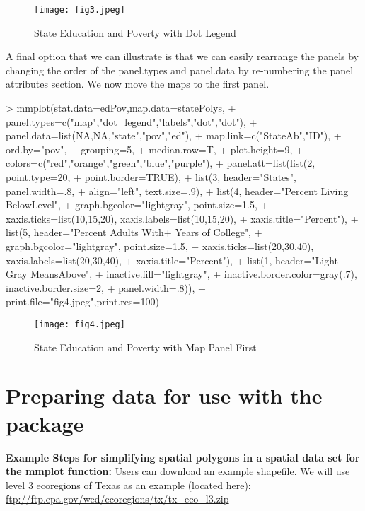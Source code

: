 \documentclass{article}
\begin{document}
\begin{figure}[!tbp] 
\begin{center} 
\texttt{[image: fig3.jpeg]}
  \caption{State Education and Poverty with Dot Legend}
  \label{fig3} 
\end{center} 
\end{figure}
A final option that we can illustrate is that we can easily rearrange the panels by changing the order of the panel.types and panel.data by re-numbering the panel attributes section.  We now move the maps to the first panel.
\begin{Schunk}
\begin{Sinput}
> mmplot(stat.data=edPov,map.data=statePolys,
+ panel.types=c("map","dot_legend","labels","dot","dot"),
+ panel.data=list(NA,NA,"state","pov","ed"),
+ map.link=c("StateAb","ID"),
+ ord.by="pov", 
+ grouping=5, 
+ median.row=T,
+ plot.height=9, 
+ colors=c("red","orange","green","blue","purple"),
+ panel.att=list(list(2, point.type=20,
+ point.border=TRUE),
+ list(3, header="States", panel.width=.8, 
+ align="left", text.size=.9),
+ list(4, header="Percent Living Below\nPoverty Level",
+ graph.bgcolor="lightgray", point.size=1.5,
+ xaxis.ticks=list(10,15,20), xaxis.labels=list(10,15,20),
+ xaxis.title="Percent"),
+ list(5, header="Percent Adults With+ Years of College",
+ graph.bgcolor="lightgray", point.size=1.5,
+ xaxis.ticks=list(20,30,40), xaxis.labels=list(20,30,40), 
+ xaxis.title="Percent"),
+ list(1, header="Light Gray Means\nHighlighted Above",
+ inactive.fill="lightgray",     
+ inactive.border.color=gray(.7), inactive.border.size=2, 
+ panel.width=.8)),
+ print.file="fig4.jpeg",print.res=100)
\end{Sinput}
\end{Schunk}
\begin{figure}[!tbp] 
\begin{center} 
\texttt{[image: fig4.jpeg]} 
  \caption{State Education and Poverty with Map Panel First}
  \label{fig4} 
\end{center} 
\end{figure}

\section{Preparing data for use with the package}
\textbf{Example Steps for simplifying spatial polygons in a spatial data set for the mmplot function:}
Users can download an example shapefile.  We will use level 3 ecoregions of Texas as an example (located here):\\
\url{ftp://ftp.epa.gov/wed/ecoregions/tx/tx_eco_l3.zip}\\
\end{document}
